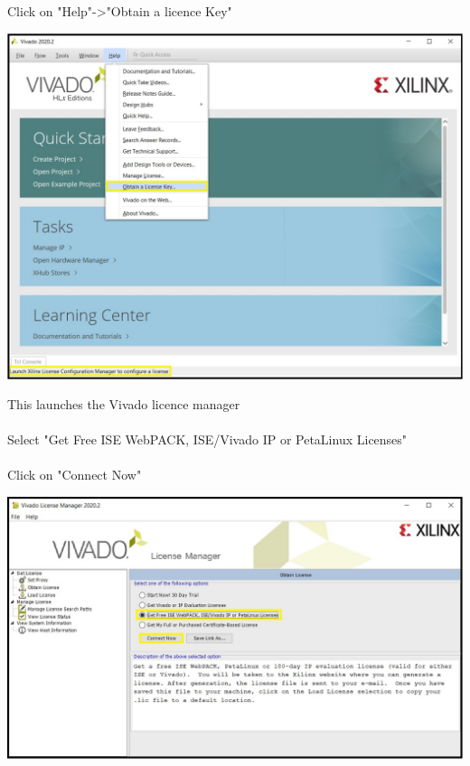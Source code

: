 \begin{minipage}{\linewidth}
  Click on "Help"->"Obtain a licence Key"
  \\
  \begin{center}
    \includegraphics[width=0.7\linewidth]{images/VivadoInstimg022.jpg}
  \end{center}
\end{minipage}

\begin{minipage}{\linewidth}
This launches the Vivado licence manager \\
  \\
  Select "Get Free ISE WebPACK, ISE/Vivado IP or PetaLinux Licenses" \\
  \\
  Click on "Connect Now"
  \\
  \begin{center}
    \includegraphics[width=\linewidth]{images/VivadoInstimg023.jpg}
  \end{center}
\end{minipage}

